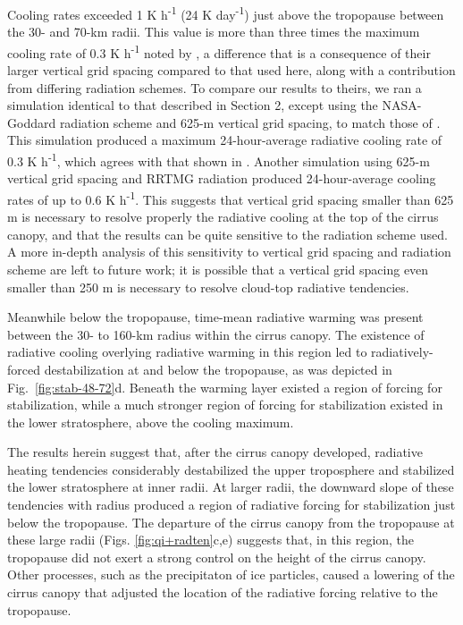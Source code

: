 \documentclass{ametsoc}
\begin{document}
Cooling rates exceeded 1 K h\textsuperscript{-1} (24 K day\textsuperscript{-1}) just above the tropopause between the 30- and 70-km radii.
This value is more than three times the maximum cooling rate of 0.3 K h\textsuperscript{-1} noted by \cite{Buetal}, a difference that is a consequence of their larger vertical grid spacing compared to that used here, along with a contribution from differing radiation schemes.
To compare our results to theirs, we ran a simulation identical to that described in Section 2, except using the NASA-Goddard radiation scheme and 625-m vertical grid spacing, to match those of \cite{Buetal}.
This simulation produced a maximum 24-hour-average radiative cooling rate of 0.3 K h\textsuperscript{-1}, which agrees with that shown in \cite{Buetal}.
Another simulation using 625-m vertical grid spacing and RRTMG radiation produced 24-hour-average cooling rates of up to 0.6 K h\textsuperscript{-1}.
This suggests that vertical grid spacing smaller than 625 m is necessary to resolve properly the radiative cooling at the top of the cirrus canopy, and that the results can be quite sensitive to the radiation scheme used.
A more in-depth analysis of this sensitivity to vertical grid spacing and radiation scheme are left to future work; it is possible that a vertical grid spacing even smaller than 250 m is necessary to resolve cloud-top radiative tendencies.

Meanwhile below the tropopause, time-mean radiative warming was present between the 30- to 160-km radius within the cirrus canopy.
The existence of radiative cooling overlying radiative warming in this region led to radiatively-forced destabilization at and below the tropopause, as was depicted in Fig.~\ref{fig:stab-48-72}d.
Beneath the warming layer existed a region of forcing for stabilization, while a much stronger region of forcing for stabilization existed in the lower stratosphere, above the cooling maximum.

The results herein suggest that, after the cirrus canopy developed, radiative heating tendencies considerably destabilized the upper troposphere and stabilized the lower stratosphere at inner radii.
At larger radii, the downward slope of these tendencies with radius produced a region of radiative forcing for stabilization just below the tropopause.
The departure of the cirrus canopy from the tropopause at these large radii (Figs. \ref{fig:qi+radten}c,e) suggests that, in this region, the tropopause did not exert a strong control on the height of the cirrus canopy.
Other processes, such as the precipitaton of ice particles, caused a lowering of the cirrus canopy that adjusted the location of the radiative forcing relative to the tropopause.
\end{document}

